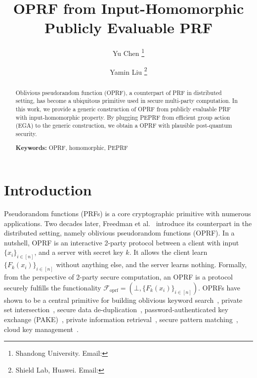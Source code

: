 \documentclass[a4paper,10pt]{article}
\begin{document}
\thispagestyle{empty}

\title{OPRF from Input-Homomorphic Publicly Evaluable PRF}


\author{
  Yu Chen
  \thanks{Shandong University. 
        Email: }
  \and
  \and
  Yamin Liu
  \thanks{Shield Lab, Huawei. Email: }
}



\date{}

\maketitle

\begin{abstract}

Oblivious pseudorandom function (OPRF), a counterpart of PRF in distributed setting, 
has become a ubiquitous primitive used in secure multi-party computation.  
In this work, we provide a generic construction of OPRF from publicly evaluable PRF with input-homomorphic property. 
By plugging PEPRF from efficient group action (EGA) to the generic construction, we obtain a OPRF with plausible post-quantum security.  
           
\begin{trivlist}
\item \textbf{Keywords:} OPRF, homomorphic, PEPRF
\end{trivlist}
\end{abstract}

\thispagestyle{empty}

\newpage
\setcounter{tocdepth}{2}
\tableofcontents
\newpage

\pagestyle{plain}
\setcounter{page}{1}
    
    
\section{Introduction}\label{sec:introduction}
Pseudorandom functions (PRFs) is a core cryptographic primitive with numerous applications. 
Two decades later, Freedman et al.~\cite{FIPR-TCC-2005} introduce its counterpart in the distributed setting, 
namely oblivious pseudorandom functions (OPRF). 
In a nutshell, OPRF is an interactive 2-party protocol between a client with input $\{x_i\}_{i \in [n]}$,  
and a server with secret key $k$. 
It allows the client learn $\{F_k(x_i)\}_{i \in [n]}$ without anything else, and the server learns nothing. 
Formally, from the perspective of 2-party secure computation, an OPRF is a protocol securely 
fulfills the functionality $\mathcal{F}_\text{oprf} = (\bot, \{F_k(x_i)\}_{i \in [n]})$.   
OPRFs have shown to be a central primitive for building oblivious keyword search~\cite{FIPR-TCC-2005}, 
private set intersection~\cite{KKRT-CCS-2016, HL-JoC-2010, CM-CRYPTO-2020}, 
secure data de-duplication~\cite{CCGS-FC-2019}, 
password-authenticated key exchange (PAKE)~\cite{JKK-ASIACRYPT-2014,JKX-EUROCRYPT-2018}, 
private information retrieval~\cite{FIPR-TCC-2005}, secure pattern matching~\cite{FHV-ICALP-2013}, 
cloud key management~\cite{JKR-CCS-2019}. 
\end{document}

